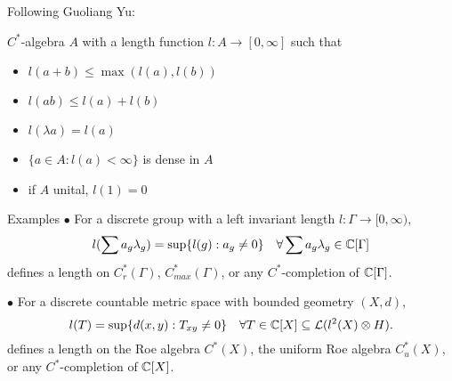 \begin{frame}
Following Guoliang Yu:
\begin{definition}
$C^*$-algebra $A$ with a length function $l: A \rightarrow [0,\infty]$ such that
\begin{itemize}
\item $l(a+b)\leq \max (l(a), l(b))$
\item $l(ab)\leq l(a)+ l(b)$
\item $l(\lambda a )= l (a)$
\item $\{a\in A : l(a)< \infty\}$ is dense in $A$
\item if $A$ unital, $l(1)=0$
\end{itemize}
\end{definition}
\end{frame}

\begin{frame}{Examples}
$\bullet$ For a discrete group with a left invariant length $l: \Gamma \rightarrow [0,\infty)$, 
\[l(\sum a_g \lambda_g) = \sup \{ l(g) : a_g \neq 0 \} \quad \forall \sum a_g \lambda_g \in \mathbb C [\Gamma]  \]
defines a length on $C_r^*(\Gamma)$, $C_{max}^*(\Gamma)$, or any $C^*$-completion of $\mathbb C [\Gamma]  $.\\

\vspace{0.5in}
 
$\bullet$ For a discrete countable metric space with bounded geometry $(X,d)$,
\[l(T) = \sup \{ d(x,y) : T_{xy}\neq 0 \} \quad \forall T\in \mathbb C [X] \subseteq \mathcal L(l^2(X)\otimes H).  \]
defines a length on the Roe algebra $C^*(X)$, the uniform Roe algebra $C_{u}^*(X)$, or any $C^*$-completion of $\mathbb C [X]  $.\\
\end{frame}

\begin{frame} 
\end{frame}